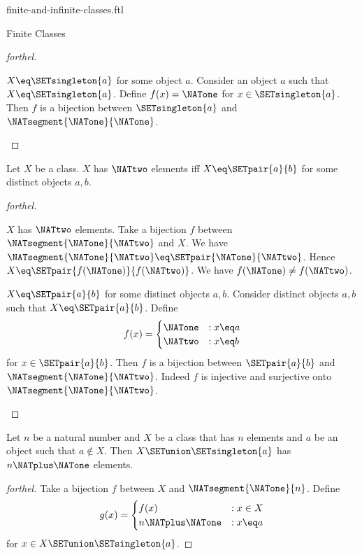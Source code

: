 \documentclass{naproche-library}
\begin{document}
\begin{smodule}[title=Finite and Infinite Classes]{finite-and-infinite-classes.ftl}
\begin{sfragment}{Finite Classes}
\begin{proof}[forthel]
    \begin{case}{$X \eq \SETsingleton{a}$ for some object $a$.}
      Consider an object $a$ such that $X \eq \SETsingleton{a}$.
      Define $f(x) = \NATone$ for $x \in \SETsingleton{a}$.
      Then $f$ is a bijection between $\SETsingleton{a}$ and $\NATsegment{\NATone}{\NATone}$.
    \end{case}
  \end{proof}

  \begin{proposition}[forthel,id=FOUNDATIONS_14_3468912675458910]
    Let $X$ be a class.
    $X$ has $\NATtwo$ elements iff $X \eq \SETpair{a}{b}$ for some distinct objects $a, b$.
  \end{proposition}
  \begin{proof}[forthel]
    \begin{case}{$X$ has $\NATtwo$ elements.}
      Take a bijection $f$ between $\NATsegment{\NATone}{\NATtwo}$ and $X$.
      We have $\NATsegment{\NATone}{\NATtwo} \eq \SETpair{\NATone}{\NATtwo}$.
      Hence $X \eq \SETpair{f(\NATone)}{f(\NATtwo)}$.
      We have $f(\NATone) \neq f(\NATtwo)$.
    \end{case}

    \begin{case}{$X \eq \SETpair{a}{b}$ for some distinct objects $a, b$.}
      Consider distinct objects $a, b$ such that $X \eq \SETpair{a}{b}$.
      Define \[f(x) =
        \begin{cases}
          \NATone & : x \eq a \\
          \NATtwo & : x \eq b
        \end{cases}\]
      for $x \in \SETpair{a}{b}$.
      Then $f$ is a bijection between $\SETpair{a}{b}$ and $\NATsegment{\NATone}{\NATtwo}$.
      Indeed $f$ is injective and surjective onto $\NATsegment{\NATone}{\NATtwo}$.
    \end{case}
  \end{proof}

  \begin{proposition}[forthel,id=FOUNDATIONS_14_0615204230800975]
    Let $n$ be a natural number and $X$ be a class that has $n$ elements and $a$ be an object such that $a \notin X$.
    Then $X \SETunion \SETsingleton{a}$ has $n \NATplus \NATone$ elements.
  \end{proposition}
  \begin{proof}[forthel]
    Take a bijection $f$ between $X$ and $\NATsegment{\NATone}{n}$.
    Define \[g(x) =
      \begin{cases}
        f(x)  & : x \in X \\
        n \NATplus \NATone & : x \eq a
      \end{cases}\]
    for $x \in X \SETunion \SETsingleton{a}$.


\end{proof}
\end{sfragment}
\end{smodule}
\end{document}
